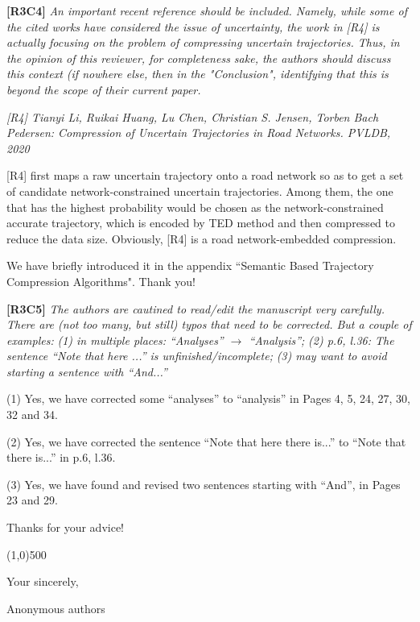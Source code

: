 \documentclass{letter}
\begin{document}
\textbf{[R3C4]} \emph{An important recent reference should be included. Namely, while some of the cited works have considered the issue of uncertainty, the work in [R4] is actually focusing on the problem of compressing uncertain trajectories. Thus, in the opinion of this reviewer, for completeness sake, the authors should discuss this context (if nowhere else, then in the "Conclusion", identifying that this is beyond the scope of their current paper. }

\emph{[R4] Tianyi Li, Ruikai Huang, Lu Chen, Christian S. Jensen, Torben Bach Pedersen:
	Compression of Uncertain Trajectories in Road Networks. PVLDB, 2020}

[R4] first maps a raw uncertain trajectory onto a road network so as to get a set of candidate network-constrained uncertain trajectories. Among them, the one that has the highest probability would be chosen
as the network-constrained accurate trajectory, which is encoded by TED method and then compressed to reduce the data size. Obviously, [R4] is a road network-embedded compression. 


We have briefly introduced it in the appendix ``Semantic Based Trajectory Compression Algorithms". Thank you!


\textbf{[R3C5]} \emph{The authors are cautined to read/edit the manuscript very carefully. There are (not too many, but still) typos that need to be corrected. But a couple of examples:}
  \emph{(1) in multiple places: ``Analyses'' $\rightarrow$ ``Analysis'';}
  \emph{(2) p.6, l.36: The sentence ``Note that here ...'' is unfinished/incomplete;}
  \emph{(3) may want to avoid starting a sentence with ``And...''}


(1) Yes, we have corrected some ``analyses'' to ``analysis'' in Pages 4, 5, 24, 27, 30, 32 and 34.

(2) Yes, we have corrected the sentence ``Note that here there is...'' to ``Note that there is...'' in p.6, l.36.

(3) Yes, we have found and revised two sentences starting with ``And'', in Pages 23 and 29.

Thanks for your advice!

\line(1,0){500}



Your sincerely,

Anonymous authors

%
%
\end{document}
